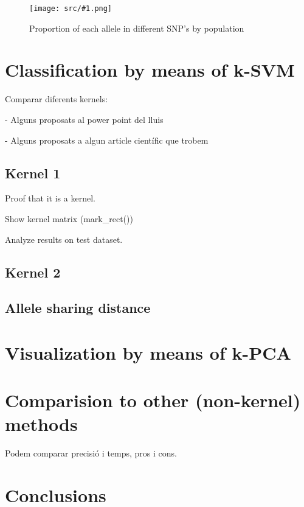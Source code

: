 \documentclass[a4paper, 11pt]{article}
\newcommand{\Figure}[3]{
	\begin{figure}[!h]
	\centering
	\texttt{[image: src/\#1.png]}
	\caption{#3}
	\label{fig:#1}
	\end{figure}
}
\theoremstyle{definition}
\theoremstyle{remark}
\begin{document}
\Figure{allele_distribution}{14}{Proportion of each allele in different SNP's by population}


\section{Classification by means of k-SVM}

Comparar diferents kernels:

- Alguns proposats al power point del lluis

- Alguns proposats a algun article científic que trobem

\subsection{Kernel 1}

Proof that it is a kernel.

Show kernel matrix (mark\_rect())

Analyze results on test dataset.

\subsection{Kernel 2}

\subsection{Allele sharing distance}

\section{Visualization by means of k-PCA}

\section{Comparision to other (non-kernel) methods}
Podem comparar precisió i temps, pros i cons.

\section{Conclusions}

\newpage

\printbibliography[
heading=bibintoc,
title={References}
]
\end{document}

